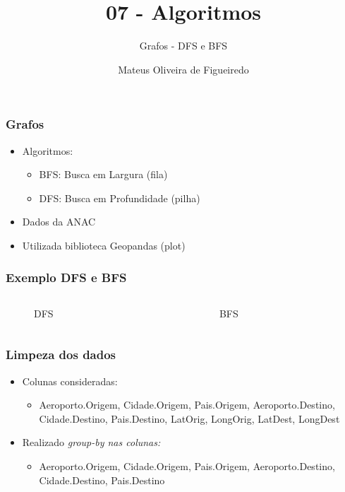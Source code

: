\documentclass[aspectratio=169,usenames,dvipsnames]{beamer}
\title{07 - Algoritmos}
\subtitle{Grafos - DFS e BFS}
\author{Mateus Oliveira de Figueiredo}
\date{}
\begin{document}
\begin{frame}
\titlepage
\end{frame}

\begin{frame}
\frametitle{Grafos}
\vfill
\begin{itemize}
  \item  Algoritmos:
  \begin{itemize}
    \item BFS: Busca em Largura (fila)
    \item DFS: Busca em Profundidade (pilha)
  \end{itemize}
  \item Dados da ANAC 
  \item Utilizada biblioteca Geopandas (plot)
\end{itemize}
\vfill
\end{frame}



\begin{frame}
\frametitle{Exemplo DFS e BFS}

  \begin{columns}
    \begin{column}{0.5\textwidth}
      \begin{figure}
        \centering
        
        \caption{DFS}
      \end{figure}
    \end{column}
    \begin{column}{0.5\textwidth}
      \begin{figure}
      \centering
      
      \caption{BFS}
      \end{figure}
    \end{column}
  \end{columns}

\end{frame}

\begin{frame}
\frametitle{Limpeza dos dados}
\vfill
\begin{itemize}
  \item Colunas consideradas:
  \begin{itemize}
    \item Aeroporto.Origem, Cidade.Origem, Pais.Origem, Aeroporto.Destino, Cidade.Destino, Pais.Destino, LatOrig, LongOrig, LatDest, LongDest
  \end{itemize}

  \item Realizado \it{group-by} nas colunas:
  \begin{itemize}
    \item Aeroporto.Origem, Cidade.Origem, Pais.Origem, Aeroporto.Destino, Cidade.Destino, Pais.Destino
  \end{itemize}
\end{itemize}
\vfill
\end{frame}
\end{document}
